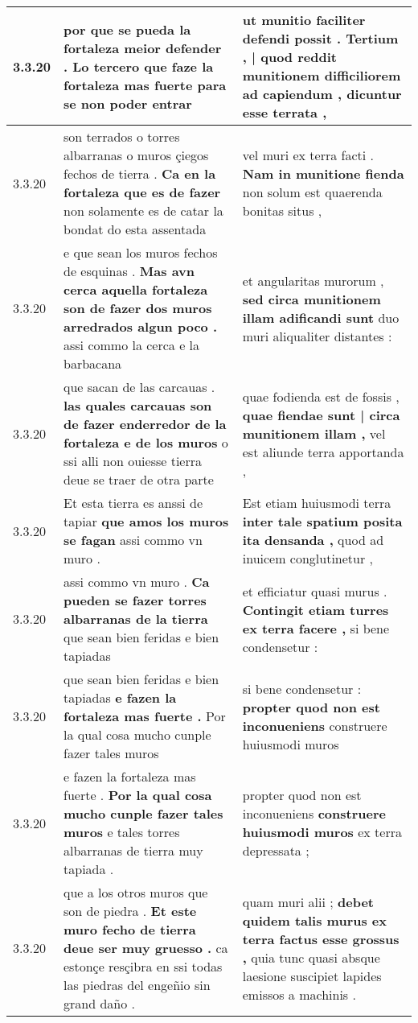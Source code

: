 \begin{tabular}{|p{1cm}|p{6.5cm}|p{6.5cm}|}
3.3.20 & por que se pueda la fortaleza meior defender . \textbf{ Lo tercero que faze la fortaleza mas fuerte } para se non poder entrar & ut munitio faciliter defendi possit . \textbf{ Tertium , | quod reddit munitionem difficiliorem ad capiendum , } dicuntur esse terrata , \\\hline
3.3.20 & son terrados o torres albarranas o muros çiegos fechos de tierra . \textbf{ Ca en la fortaleza que es de fazer } non solamente es de catar la bondat do esta assentada & vel muri ex terra facti . \textbf{ Nam in munitione fienda } non solum est quaerenda bonitas situs , \\\hline
3.3.20 & e que sean los muros fechos de esquinas . \textbf{ Mas avn cerca aquella fortaleza son de fazer dos muros arredrados algun poco . } assi commo la cerca e la barbacana & et angularitas murorum , \textbf{ sed circa munitionem illam adificandi sunt } duo muri aliqualiter distantes : \\\hline
3.3.20 & que sacan de las carcauas . \textbf{ las quales carcauas son de fazer enderredor de la fortaleza e de los muros } o ssi alli non ouiesse tierra deue se traer de otra parte & quae fodienda est de fossis , \textbf{ quae fiendae sunt | circa munitionem illam , } vel est aliunde terra apportanda , \\\hline
3.3.20 & Et esta tierra es anssi de tapiar \textbf{ que amos los muros se fagan } assi commo vn muro . & Est etiam huiusmodi terra \textbf{ inter tale spatium posita ita densanda , } quod ad inuicem conglutinetur , \\\hline
3.3.20 & assi commo vn muro . \textbf{ Ca pueden se fazer torres albarranas de la tierra } que sean bien feridas e bien tapiadas & et efficiatur quasi murus . \textbf{ Contingit etiam turres ex terra facere , } si bene condensetur : \\\hline
3.3.20 & que sean bien feridas e bien tapiadas \textbf{ e fazen la fortaleza mas fuerte . } Por la qual cosa mucho cunple fazer tales muros & si bene condensetur : \textbf{ propter quod non est inconueniens } construere huiusmodi muros \\\hline
3.3.20 & e fazen la fortaleza mas fuerte . \textbf{ Por la qual cosa mucho cunple fazer tales muros } e tales torres albarranas de tierra muy tapiada . & propter quod non est inconueniens \textbf{ construere huiusmodi muros } ex terra depressata ; \\\hline
3.3.20 & que a los otros muros que son de piedra . \textbf{ Et este muro fecho de tierra deue ser muy gruesso . } ca estonçe resçibra en ssi todas las piedras del engeñio sin grand daño . & quam muri alii ; \textbf{ debet quidem talis murus ex terra factus esse grossus , } quia tunc quasi absque laesione suscipiet lapides emissos a machinis . \\\hline

\end{tabular}
